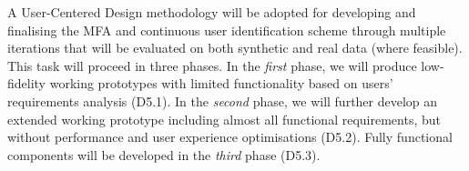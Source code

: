 \begin{Workpackage}{\thewpno}
\begin{Task}
A User-Centered Design methodology will be adopted for developing and finalising the MFA and continuous user identification scheme through multiple iterations that will be evaluated on both synthetic and real data (where feasible). 
This task will proceed in three phases. In the \emph{first} phase, we will produce low-fidelity working prototypes with limited functionality based on users’ requirements analysis (D5.1). In the \emph{second} phase, we will further develop an extended working prototype including almost all functional requirements, but without performance and user experience optimisations (D5.2). Fully functional components will be developed in the \emph{third} phase (D5.3). 

\end{Task}
\end{Workpackage}
